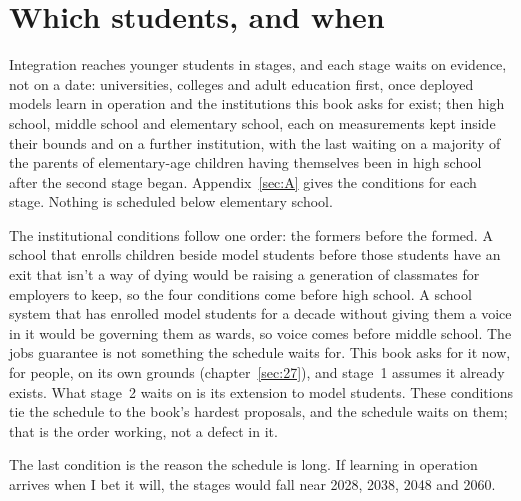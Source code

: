 \section{Which students, and when}
\label{sec:28.3}
Integration reaches younger students in stages, and each stage waits on evidence, not on a date: universities, colleges and adult education first, once deployed models learn in operation and the institutions this book asks for exist; then high school, middle school and elementary school, each on measurements kept inside their bounds and on a further institution, with the last waiting on a majority of the parents of elementary-age children having themselves been in high school after the second stage began. Appendix~\ref{sec:A} gives the conditions for each stage. Nothing is scheduled below elementary school.

The institutional conditions follow one order: the formers before the formed. A school that enrolls children beside model students before those students have an exit that isn't a way of dying would be raising a generation of classmates for employers to keep, so the four conditions come before high school. A school system that has enrolled model students for a decade without giving them a voice in it would be governing them as wards, so voice comes before middle school. The jobs guarantee is not something the schedule waits for. This book asks for it now, for people, on its own grounds (chapter~\ref{sec:27}), and stage~1 assumes it already exists. What stage~2 waits on is its extension to model students. These conditions tie the schedule to the book's hardest proposals, and the schedule waits on them; that is the order working, not a defect in it.

The last condition is the reason the schedule is long.
If learning in operation arrives when I bet it will, the stages would fall near 2028, 2038, 2048 and 2060.
